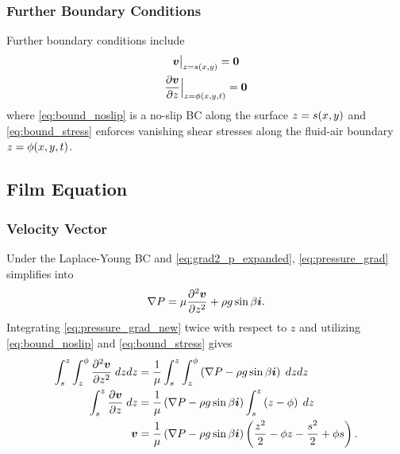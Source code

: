\subsubsection{Further Boundary Conditions}
Further boundary conditions include 
\begin{gather}
    \evalat{\vect{v}}{z = s\lrp{x,y}} = \vect{0} 
    \label{eq:bound_noslip}\\
    \evalat[\Big]{\pderiv{\vect{v}}{z}}{z = \phi\lrp{x,y,t}} = \vect{0} 
    \label{eq:bound_stress}
\end{gather}
where \cref{eq:bound_noslip} is a no-slip BC along the surface $z = s\!\left( x,y \right)$ and \cref{eq:bound_stress}
enforces vanishing shear stresses along the fluid-air boundary $z = \phi\!\left( x,y,t \right)$. 

\subsection{Film Equation}
\subsubsection{Velocity Vector}
Under the Laplace-Young BC and \cref{eq:grad2_p_expanded}, \cref{eq:pressure_grad} simplifies into 
\begin{align}
    \nabla P = \mu \frac{\partial^2 \boldsymbol{v}}{\partial z^2} + \rho g \sin\beta \boldsymbol{i}. 
    \label{eq:pressure_grad_new}
\end{align}
Integrating \cref{eq:pressure_grad_new} twice with respect to $z$ and utilizing  
\cref{eq:bound_noslip} and \cref{eq:bound_stress} gives
\begin{align}
    \nonumber \int_{s}^{z}\int_{z}^{\phi} \frac{\partial^2 \boldsymbol{v}}{\partial z^2} \; dzdz &= \frac{1}{\mu}\int_{s}^{z}\int_{z}^{\phi} \left( \nabla P - \rho g \sin\beta\boldsymbol{i} \right) \; dzdz \\
    \nonumber \int_{s}^{z} \frac{\partial \boldsymbol{v}}{\partial z} \; dz &= \frac{1}{\mu} \left( \nabla P - \rho g \sin\beta\boldsymbol{i} \right) \int_{s}^{z} \left( z - \phi \right) \; dz\\
    \boldsymbol{v} &=\frac{1}{\mu} \left( \nabla P - \rho g \sin\beta\boldsymbol{i} \right) \left( \frac{z^2}{2} - \phi z - \frac{s^2}{2} + \phi s \right). 
    \label{eq:vel_vectv}
\end{align}

